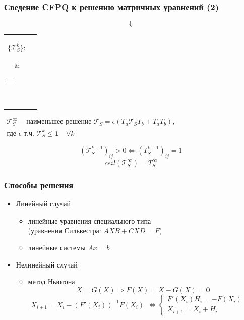 \documentclass[xcolor=table]{beamer}
\begin{document}
\begin{frame}[fragile]
  \transwipe[direction=90]
  \frametitle{Сведение CFPQ к решению матричных уравнений (2)}
  
    $$\Downarrow$$
    \centering
    \begin{tabular}{cl}
    \parbox{0.07\linewidth}{
    $\{ \mathcal{T}_S^k \}:$
    }
    & \begin{tabular}{l}
    $\mathcal{T}_S^0 = \mathbf{0}$ \\
    $\mathcal{T}_S^{k+1} = \epsilon(T_a \mathcal{T}_S^k T_b + T_a T_b)$
    \end{tabular} \\
    \end{tabular}

    \vspace{20pt}
    \(
    \left.
    \begin{array}{c}
    \mathcal{T}_S^{\infty} - \texttt{наименьшее решение } \mathcal{T}_S = \epsilon(T_a \mathcal{T}_S T_b + T_a T_b), \\
    \texttt{где } \epsilon \texttt{ т.ч. } \mathcal{T}_{S}^{k} \leq \textbf{1} \quad \forall k
    \end{array}
    \right.
    \)
  
  \pause
  
  $$(\mathcal{T}_S^{k+1})_{ij} > 0 \iff (T_S^{k+1})_{ij} = 1$$
  $$ceil(\mathcal{T}_S^{\infty}) = T_S^{\infty}$$


\end{frame}

\begin{frame}[fragile]
  \transwipe[direction=90]
  \frametitle{Способы решения}
 
\begin{itemize}
    \item Линейный случай
    \begin{itemize}
        \item линейные уравнения специального типа \\
        (уравнения Сильвестра: $AXB + CXD = F$)
        \item линейные системы $Ax=b$
    \end{itemize}
    \item Нелинейный случай
    \begin{itemize}
        \item метод Ньютона \\
                $$X = G(X) \Rightarrow F(X) = X - G(X) = \mathbf{0}$$
                \(
                \left.
                \begin{array}{l}
                X_{i+1} = X_i - (F'(X_i))^{-1}F(X_i)
                \end{array}
                \right.
                \iff
                \left\{
                \begin{array}{l}
                F'(X_i)H_i = - F(X_i) \\
                X_{i+1} = X_i + H_i
                \end{array}
                \right.
                \)
    \end{itemize}
\end{itemize}
\end{frame}
\end{document}
